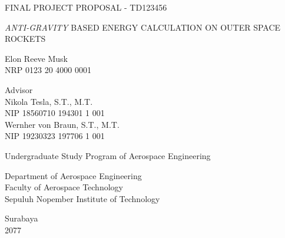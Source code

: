 \begin{large}
  FINAL PROJECT PROPOSAL - TD123456
\end{large}

\vspace{\fill}

\begin{spacing}{1.5}
  \begin{Large}
    \emph{ANTI-GRAVITY} BASED ENERGY CALCULATION ON OUTER SPACE ROCKETS
  \end{Large}
\end{spacing}

\vspace{\fill}

\begin{large}
  Elon Reeve Musk \\
  \textmd{NRP 0123 20 4000 0001}
\end{large}

\vspace{\fill}

\begin{large}
  \textmd{Advisor} \\
  Nikola Tesla, S.T., M.T. \\
  \textmd{NIP 18560710 194301 1 001} \\
  Wernher von Braun, S.T., M.T. \\
  \textmd{NIP 19230323 197706 1 001}
\end{large}

\vspace{\fill}

Undergraduate Study Program of Aerospace Engineering \\

\mdseries

Department of Aerospace Engineering \\
Faculty of Aerospace Technology \\
Sepuluh Nopember Institute of Technology

Surabaya \\
2077


